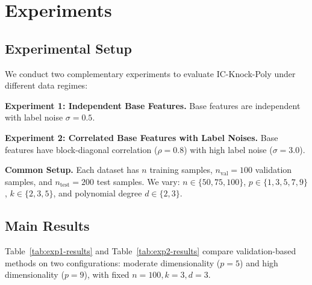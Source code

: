 \section{Experiments}
\label{sec:experiments}

\subsection{Experimental Setup}
\label{subsec:setup}

We conduct two complementary experiments to evaluate IC-Knock-Poly under different data regimes:

\textbf{Experiment 1: Independent Base Features.} Base features are independent with label noise $\sigma = 0.5$.

\textbf{Experiment 2: Correlated Base Features with Label Noises.} Base features have block-diagonal correlation ($\rho=0.8$) with high label noise ($\sigma = 3.0$).

\textbf{Common Setup.} Each dataset has $n$ training samples, $n_{\text{val}} = 100$ validation samples, and $n_{\text{test}} = 200$ test samples. We vary: $n \in \{50, 75, 100\}$, $p \in \{1, 3, 5, 7, 9\}$, $k \in \{2, 3, 5\}$, and polynomial degree $d \in \{2, 3\}$.

\subsection{Main Results}
\label{subsec:main-results}

Table~\ref{tab:exp1-results} and Table~\ref{tab:exp2-results} compare validation-based methods on two configurations: moderate dimensionality ($p=5$) and high dimensionality ($p=9$), with fixed $n=100, k=3, d=3$.

